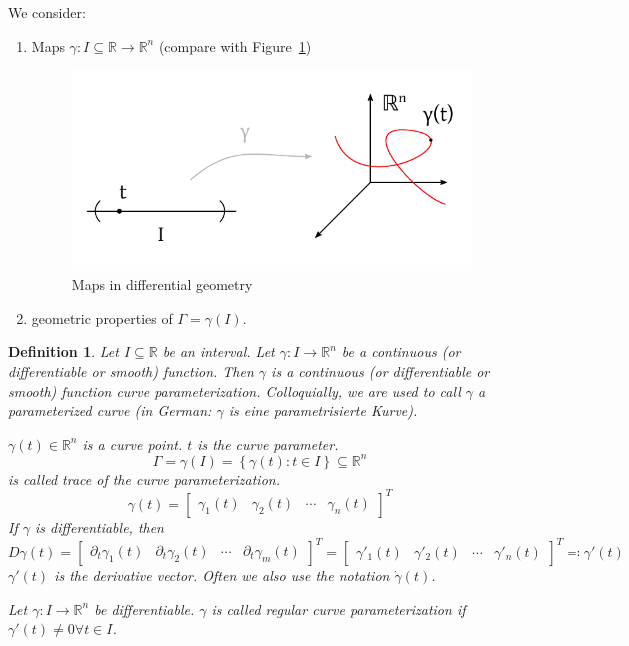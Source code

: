 \documentclass{article}
\newtheorem{definition}{Definition}  \numberwithin{definition}{section}
\newcommand{\set}[1]{\left\{#1\right\}}
\begin{document}
We consider:
\begin{enumerate}
  \item Maps $\gamma: I \subseteq \mathbb R \to \mathbb R^n$ (compare with Figure~\ref{img:maps-diffgeo})
    \begin{figure}[t]
      \begin{center}
        \includegraphics{img/37_map.pdf}
        \caption{Maps in differential geometry}
        \label{img:maps-diffgeo}
      \end{center}
    \end{figure}
  \item geometric properties of $\Gamma = \gamma(I)$.
\end{enumerate}

\begin{definition} %
  Let $I \subseteq \mathbb R$ be an interval.
  Let $\gamma: I \to \mathbb R^n$ be a continuous (or differentiable or smooth) function.
  Then $\gamma$ is a continuous (or differentiable or smooth) function curve parameterization.
  Colloquially, we are used to call $\gamma$ a \emph{parameterized curve} (in German: \foreignlanguage{german}{$\gamma$ is eine parametrisierte Kurve}).

  $\gamma(t) \in \mathbb R^n$ is a curve point.
  $t$ is the curve parameter.
  \[ \Gamma = \gamma(I) = \set{\gamma(t): t \in I} \subseteq \mathbb R^n \]
  is called trace of the curve parameterization.
  \[ \gamma(t) = \begin{bmatrix} \gamma_1(t) & \gamma_2(t) & \cdots & \gamma_n(t) \end{bmatrix}^T \]
  If $\gamma$ is differentiable, then
  \[ D\gamma(t)
        = \begin{bmatrix} \partial_t \gamma_1(t) & \partial_t \gamma_2(t) & \cdots & \partial_t \gamma_m(t) \end{bmatrix}^T
        = \begin{bmatrix} \gamma'_1(t) & \gamma'_2(t) & \cdots & \gamma'_n(t) \end{bmatrix}^T \eqqcolon \gamma'(t)
  \]
  $\gamma'(t)$ is the derivative vector. Often we also use the notation $\dot{\gamma}(t)$.

  Let $\gamma: I \to \mathbb R^n$ be differentiable.
  $\gamma$ is called \emph{regular curve parameterization} if $\gamma'(t) \neq 0 \forall t \in I$.
\end{definition}
\end{document}

